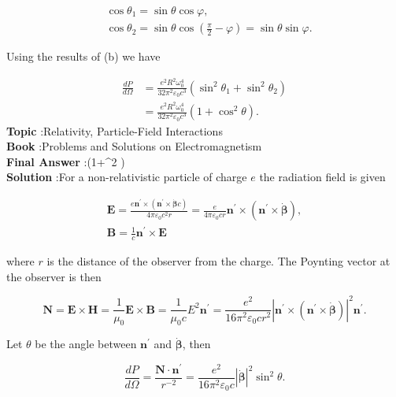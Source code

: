 \documentclass[10pt]{article}
\begin{document}
$$
\begin{aligned}
&\cos \theta_{1}=\sin \theta \cos \varphi, \\
&\cos \theta_{2}=\sin \theta \cos \left(\frac{\pi}{2}-\varphi\right)=\sin \theta \sin \varphi .
\end{aligned}
$$

Using the results of (b) we have

$$
\begin{aligned}
\frac{d P}{d \Omega} &=\frac{e^{2} R^{2} \omega_{0}^{4}}{32 \pi^{2} \varepsilon_{0} c^{3}}\left(\sin ^{2} \theta_{1}+\sin ^{2} \theta_{2}\right) \\
&=\frac{e^{2} R^{2} \omega_{0}^{4}}{32 \pi^{2} \varepsilon_{0} c^{3}}\left(1+\cos ^{2} \theta\right) .
\end{aligned}
$$
\textbf{Topic} :Relativity, Particle-Field Interactions\\
\textbf{Book} :Problems and Solutions on Electromagnetism\\
\textbf{Final Answer} :\left(1+\cos ^{2} \theta\right)\\


\textbf{Solution} :For a non-relativistic particle of charge $e$ the radiation field is given

$$
\begin{gathered}
\mathbf{E}=\frac{e \mathbf{n}^{\prime} \times\left(\mathbf{n}^{\prime} \times \dot{\boldsymbol{\beta}} c\right)}{4 \pi \varepsilon_{0} c^{2} r}=\frac{e}{4 \pi \varepsilon_{0} c r} \mathbf{n}^{\prime} \times\left(\mathbf{n}^{\prime} \times \dot{\boldsymbol{\beta}}\right), \\
\mathbf{B}=\frac{1}{c} \mathbf{n}^{\prime} \times \mathbf{E}
\end{gathered}
$$

where $r$ is the distance of the observer from the charge. The Poynting vector at the observer is then

$$
\mathbf{N}=\mathbf{E} \times \mathbf{H}=\frac{1}{\mu_{0}} \mathbf{E} \times \mathbf{B}=\frac{1}{\mu_{0} c} E^{2} \mathbf{n}^{\prime}=\frac{e^{2}}{16 \pi^{2} \varepsilon_{0} c r^{2}}\left|\mathbf{n}^{\prime} \times\left(\mathbf{n}^{\prime} \times \dot{\boldsymbol{\beta}}\right)\right|^{2} \mathbf{n}^{\prime} .
$$

Let $\theta$ be the angle between $\mathbf{n}^{\prime}$ and $\dot{\boldsymbol{\beta}}$, then

$$
\frac{d P}{d \Omega}=\frac{\mathbf{N} \cdot \mathbf{n}^{\prime}}{r^{-2}}=\frac{e^{2}}{16 \pi^{2} \varepsilon_{0} c}|\dot{\boldsymbol{\beta}}|^{2} \sin ^{2} \theta .
$$
\end{document}
